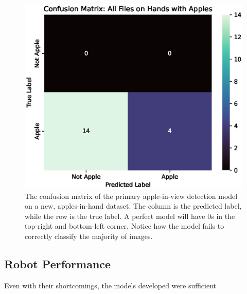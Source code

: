 \begin{figure}[!htb]
    \centering
    \includegraphics[width=\columnwidth,keepaspectratio]
    {./figures/confusion_matrix_All_Files_on_Hands_with_Apples}
    \caption{
        The confusion matrix of the primary apple-in-view detection model on a new, apples-in-hand dataset.
        The column is the predicted label, while the row is the true label.
        A perfect model will have 0s in the top-right and bottom-left corner.
        Notice how the model fails to correctly classify the majority of images.
    }
    \label{fig:apple-in-hand-confusion-matrix}
\end{figure}

\subsection{Robot Performance}\label{subsec:robot-performance}
Even with their shortcomings, the models developed were sufficient


